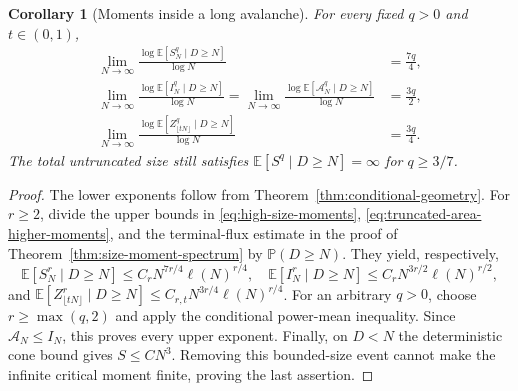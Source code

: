 \documentclass[11pt]{article}
\numberwithin{equation}{section}
\newtheorem{corollary}[theorem]{Corollary}
\theoremstyle{definition}
\newcommand{\E}{\mathbb E}
\newcommand{\Prob}{\mathbb P}
\begin{document}
\begin{corollary}[Moments inside a long avalanche]\label{cor:conditional-moments}
For every fixed $q>0$ and $t\in(0,1)$,
\begin{align}
 \lim_{N\to\infty}\frac{\log\E[S_N^q\mid D\ge N]}{\log N}&=\frac{7q}4,\label{eq:conditional-size-moments}\\
 \lim_{N\to\infty}\frac{\log\E[I_N^q\mid D\ge N]}{\log N}
 =\lim_{N\to\infty}\frac{\log\E[\mathcal A_N^q\mid D\ge N]}{\log N}&=\frac{3q}2,\label{eq:conditional-area-moments}\\
 \lim_{N\to\infty}\frac{\log\E[Z_{\lfloor tN\rfloor}^q\mid D\ge N]}{\log N}&=\frac{3q}4.\label{eq:conditional-flux-moments}
\end{align}
The total untruncated size still satisfies $\E[S^q\mid D\ge N]=\infty$ for $q\ge3/7$.
\end{corollary}
\begin{proof}
The lower exponents follow from Theorem~\ref{thm:conditional-geometry}. For $r\ge2$, divide the upper bounds in \eqref{eq:high-size-moments}, \eqref{eq:truncated-area-higher-moments}, and the terminal-flux estimate in the proof of Theorem~\ref{thm:size-moment-spectrum} by $\Prob(D\ge N)$. They yield, respectively,
\[
 \E[S_N^r\mid D\ge N]\le C_rN^{7r/4}\ell(N)^{r/4},\quad
 \E[I_N^r\mid D\ge N]\le C_rN^{3r/2}\ell(N)^{r/2},
\]
and $\E[Z_{\lfloor tN\rfloor}^r\mid D\ge N]\le C_{r,t}N^{3r/4}\ell(N)^{r/4}$. For an arbitrary $q>0$, choose $r\ge\max(q,2)$ and apply the conditional power-mean inequality. Since $\mathcal A_N\le I_N$, this proves every upper exponent. Finally, on $D<N$ the deterministic cone bound gives $S\le CN^3$. Removing this bounded-size event cannot make the infinite critical moment finite, proving the last assertion.
\end{proof}
\end{document}
